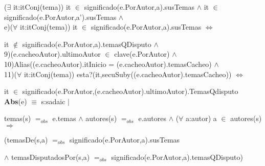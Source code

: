 \documentclass{article}
\begin{document}
\hspace{1.2cm}($\exists$ it:itConj(tema)) it $\in$ significado(e.PorAutor,a).susTemas $\wedge$ it $\in$ significado(e.PorAutor,a').susTemas $\wedge$
\\

\hspace{1.2cm}e)($\forall$ it:itConj(tema)) it $\in$ significado(e.PorAutor,a).susTemas $\Leftrightarrow$ 

\hspace{1.2cm} it $\notin$ significado(e.PorAutor,a).temasQDisputo $\wedge$
\\

\hspace{1cm}9)(e.cacheoAutor).ultimoAutor $\in$ clave(e.PorAutor) $\wedge$
\\

\hspace{1cm}10)Alias((e.cacheoAutor).itInicio = (e.cacheoAutor).temasCacheo) $\wedge$ 
\\

\hspace{1cm}11)($\forall$ it:itConj(tema)) esta?(it,secuSuby((e.cacheoAutor).temasCacheo)) $\Leftrightarrow$ 

\hspace{1cm}it $\in$ significado(e.PorAutor,(e.cacheoAutor).ultimoAutor).TemasQdisputo
\\

\hspace{1cm} \textbf{Abs}(e) $\equiv$ s:sadaic $|$

\hspace{1cm} temas(s) $=_{obs}$ e.temas $\wedge$ autores(s) $=_{obs}$ e.autores $\wedge$ ($\forall$ a:autor) a $\in$ autores(s) $\Rightarrow$ 

\hspace{1cm} (temasDe(s,a) $=_{obs}$ significado(e.PorAutor,a).susTemas 

\hspace{1cm} $\wedge$ temasDisputadosPor(s,a) $=_{obs}$ significado(e.PorAutor,a).temasQDisputo) 
\end{document}
